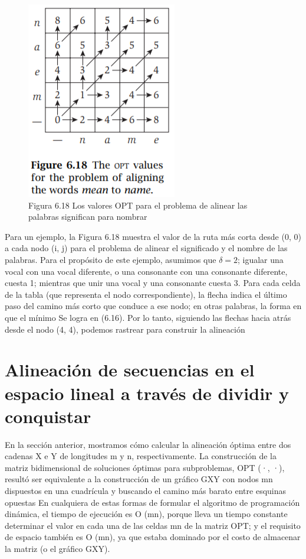 \documentclass[a4paper, 12pt]{book}
\theoremstyle{dotless}
\begin{document}
\begin{figure}[h]
\centering
\includegraphics[scale=1]{Imagenes-Seccion6/fig6_18.PNG}
\caption{Figura 6.18 Los valores OPT para el problema de alinear las palabras significan para nombrar}
\end{figure}

Para un ejemplo, la Figura 6.18 muestra el valor de la ruta más corta desde (0, 0) a cada nodo (i, j) para el problema de alinear el significado y el nombre de las palabras. Para el propósito de este ejemplo, asumimos que $ \delta =2$; igualar una vocal con una vocal diferente, o una consonante con una consonante diferente, cuesta 1; mientras que unir una vocal y una consonante cuesta 3. Para cada celda de la tabla (que representa el nodo correspondiente), la flecha indica el último paso del camino más corto que conduce a ese nodo; en otras palabras, la forma en que el mínimo Se logra en (6.16). Por lo tanto, siguiendo las flechas hacia atrás desde el nodo (4, 4), podemos rastrear para construir la alineación\\

\section{Alineación de secuencias en el espacio lineal a través de dividir y conquistar}

En la sección anterior, mostramos cómo calcular la alineación óptima entre dos cadenas X e Y de longitudes m y n, respectivamente. La construcción de la matriz bidimensional de soluciones óptimas para subproblemas, OPT (·, ·), resultó ser equivalente a la construcción de un gráfico GXY con nodos mn dispuestos en una cuadrícula y buscando el camino más barato entre esquinas opuestas En cualquiera de estas formas de formular el algoritmo de programación dinámica, el tiempo de ejecución es O (mn), porque lleva un tiempo constante determinar el valor en cada una de las celdas mn de la matriz OPT; y el requisito de espacio también es O (mn), ya que estaba dominado por el costo de almacenar la matriz (o el gráfico GXY).\\
\end{document}
